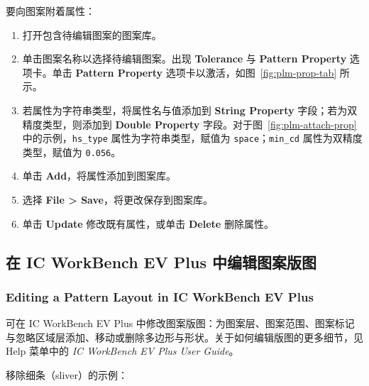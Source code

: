 要向图案附着属性：

\begin{enumerate}
  \item 打开包含待编辑图案的图案库。
  \item 单击图案名称以选择待编辑图案。出现 \textbf{Tolerance} 与 \textbf{Pattern Property} 选项卡。单击 \textbf{Pattern Property} 选项卡以激活，如图~\ref{fig:plm-prop-tab} 所示。


  \item 若属性为字符串类型，将属性名与值添加到 \textbf{String Property} 字段；若为双精度类型，则添加到 \textbf{Double Property} 字段。对于图~\ref{fig:plm-attach-prop} 中的示例，\texttt{hs\_type} 属性为字符串类型，赋值为 \texttt{space}；\texttt{min\_cd} 属性为双精度类型，赋值为 \texttt{0.056}。


  \item 单击 \textbf{Add}，将属性添加到图案库。
  \item 选择 \textbf{File > Save}，将更改保存到图案库。
  \item 单击 \textbf{Update} 修改既有属性，或单击 \textbf{Delete} 删除属性。
\end{enumerate}

\subsection{在 IC WorkBench EV Plus 中编辑图案版图}
\subsubsection*{Editing a Pattern Layout in IC WorkBench EV Plus}

可在 IC WorkBench EV Plus 中修改图案版图：为图案层、图案范围、图案标记与忽略区域层添加、移动或删除多边形与形状。关于如何编辑版图的更多细节，见 Help 菜单中的 \textit{IC WorkBench EV Plus User Guide}。

移除细条（sliver）的示例：

